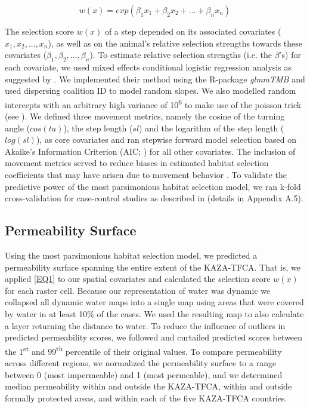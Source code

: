 \documentclass[abstract=on,10pt,a4paper,bibliography=totocnumbered]{article}
\begin{document}
\begin{equation}
\label{EQ1}
  w(x) = exp(\beta_1 x_1 + \beta_2 x_2 + ... + \beta_n x_n)
\end{equation}

\noindent The selection score \(w(x)\) of a step depended on its associated
covariates (\(x_1, x_2, ..., x_n\)), as well as on the animal's relative
selection strengths towards these covariates (\(\beta_1, \beta_2, ...,
\beta_n\)). To estimate relative selection strengths (i.e. the \(\beta\)'s) for
each covariate, we used mixed effects conditional logistic regression analysis
as suggested by \cite{Muff.2020}. We implemented their method using the
R-package \textit{glmmTMB} \citep{Mollie.2017} and used dispersing coalition ID
to model random slopes. We also modelled random intercepts with an arbitrary
high variance of 10\textsuperscript{6} to make use of the poisson trick (see
\citealp{Muff.2020}). We defined three movement metrics, namely the cosine of
the turning angle (\(cos(ta)\)), the step length (\(sl\)) and the logarithm of
the step length (\(log(sl)\)), as core covariates and ran stepwise forward model
selection based on Akaike's Information Criterion (AIC; \citealp{Burnham.2002})
for all other covariates. The inclusion of movement metrics served to reduce
biases in estimated habitat selection coefficients that may have arisen due to
movement behavior \citep{Avgar.2016}. To validate the predictive power of the
most parsimonious habitat selection model, we ran k-fold cross-validation for
case-control studies as described in \cite{Fortin.2009} (details in Appendix
A.5).

\subsection{Permeability Surface}
Using the most parsimonious habitat selection model, we predicted a permeability
surface spanning the entire extent of the KAZA-TFCA. That is, we applied
\ref{EQ1} to our spatial covariates and calculated the selection score \(w(x)\)
for each raster cell. Because our representation of water was dynamic we
collapsed all dynamic water maps into a single map using areas that were covered
by water in at least 10\% of the cases. We used the resulting map to also
calculate a layer returning the distance to water. To reduce the influence of
outliers in predicted permeability scores, we followed \cite{Squires.2013} and
curtailed predicted scores between the 1\textsuperscript{st} and
99\textsuperscript{th} percentile of their original values. To compare
permeability across different regions, we normalized the permeability surface to
a range between 0 (most impermeable) and 1 (most permeable), and we determined
median permeability within and outside the KAZA-TFCA, within and outside
formally protected areas, and within each of the five KAZA-TFCA countries.
\end{document}
